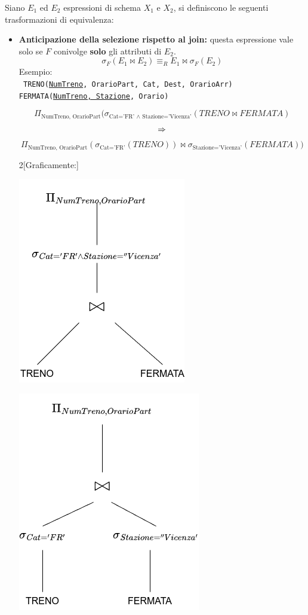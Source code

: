 \documentclass{report}
\begin{document}
\newpage
Siano $E_1$ ed $E_2$ espressioni di schema $X_1$ e $X_2$, si definiscono le seguenti trasformazioni di equivalenza:
\begin{itemize}
    \item \textbf{Anticipazione della selezione rispetto al join:} questa espressione vale solo se $F$ conivolge \textbf{solo} gli attributi di $E_2$.
\[ \sigma_{F}(E_1 \bowtie E_2) \equiv_R E_1 \bowtie \sigma_{F}(E_2) \]
Esempio:\\
\texttt{
TRENO(\underline{NumTreno}, OrarioPart, Cat, Dest, OrarioArr)\\
FERMATA(\underline{NumTreno, Stazione}, Orario)
}

\[ \Pi_{\text{NumTreno, OrarioPart}}(\sigma_{\text{Cat='FR' $\wedge$ Stazione='Vicenza'}}(TRENO \bowtie FERMATA) \]
\[ \Large \Rightarrow \]
\[ \Pi_{\text{NumTreno, OrarioPart}}(\sigma_{\text{Cat='FR'}}(TRENO)) \bowtie \sigma_{\text{Stazione='Vicenza'}}(FERMATA)) \]
\begin{multicols}{2}[Graficamente:]

\begin{center}\includegraphics[scale=0.5]{tree_example_transform}\end{center}
\begin{center}\includegraphics[scale=0.5]{tree_example_anticip_sel}\end{center}
\end{multicols}


\end{itemize}
\end{document}
